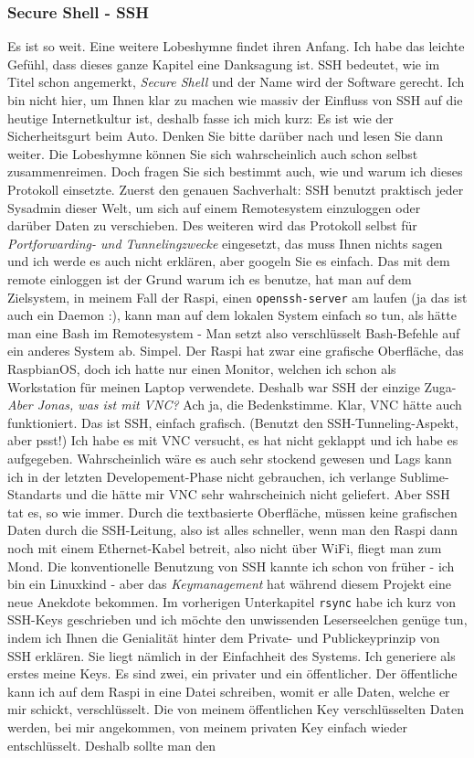 \documentclass[12pt,titlepage,a4paper]{article}
\begin{document}
\subsubsection{Secure Shell - SSH}
Es ist so weit. Eine weitere Lobeshymne findet ihren Anfang. Ich habe das leichte Gefühl, dass dieses ganze Kapitel eine Danksagung ist. SSH bedeutet, wie im Titel schon angemerkt, \textit{Secure Shell} und der Name wird der Software gerecht. Ich bin nicht hier, um Ihnen klar zu machen wie massiv der Einfluss von SSH auf die heutige Internetkultur ist, deshalb fasse ich mich kurz: Es ist wie der Sicherheitsgurt beim Auto. Denken Sie bitte darüber nach und lesen Sie dann weiter. Die Lobeshymne können Sie sich wahrscheinlich auch schon selbst zusammenreimen. Doch fragen Sie sich bestimmt auch, wie und warum ich dieses Protokoll einsetzte. Zuerst den genauen Sachverhalt: SSH benutzt praktisch jeder Sysadmin dieser Welt, um sich auf einem Remotesystem einzuloggen oder darüber Daten zu verschieben. Des weiteren wird das Protokoll selbst für \textit{Portforwarding- und Tunnelingzwecke} eingesetzt, das muss Ihnen nichts sagen und ich werde es auch nicht erklären, aber googeln Sie es einfach. Das mit dem remote einloggen ist der Grund warum ich es benutze, hat man auf dem Zielsystem, in meinem Fall der Raspi, einen \verb^openssh-server^ am laufen (ja das ist auch ein Daemon :), kann man auf dem lokalen System einfach so tun, als hätte man eine Bash im Remotesystem - Man setzt also verschlüsselt Bash-Befehle auf ein anderes System ab. Simpel. Der Raspi hat zwar eine grafische Oberfläche, das RaspbianOS, doch ich hatte nur einen Monitor, welchen ich schon als Workstation für meinen Laptop verwendete. Deshalb war SSH der einzige Zuga- \textit{Aber Jonas, was ist mit VNC?} Ach ja, die Bedenkstimme. Klar, VNC hätte auch funktioniert. Das ist SSH, einfach grafisch. (Benutzt den SSH-Tunneling-Aspekt, aber psst!) Ich habe es mit VNC versucht, es hat nicht geklappt und ich habe es aufgegeben. Wahrscheinlich wäre es auch sehr stockend gewesen und Lags kann ich in der letzten Developement-Phase nicht gebrauchen, ich verlange Sublime-Standarts und die hätte mir VNC sehr wahrscheinich nicht geliefert. Aber SSH tat es, so wie immer. Durch die textbasierte Oberfläche, müssen keine grafischen Daten durch die SSH-Leitung, also ist alles schneller, wenn man den Raspi dann noch mit einem Ethernet-Kabel betreit, also nicht über WiFi, fliegt man zum Mond. Die konventionelle Benutzung von SSH kannte ich schon von früher - ich bin ein Linuxkind - aber das \textit{Keymanagement} hat während diesem Projekt eine neue Anekdote bekommen. Im vorherigen Unterkapitel \verb/rsync/ habe ich kurz von SSH-Keys geschrieben und ich möchte den unwissenden Leserseelchen genüge tun, indem ich Ihnen die Genialität hinter dem Private- und Publickeyprinzip von SSH  erklären. Sie liegt nämlich in der Einfachheit des Systems. Ich generiere als erstes meine Keys. Es sind zwei, ein privater und ein öffentlicher. Der öffentliche kann ich auf dem Raspi in eine Datei schreiben, womit er alle Daten, welche er mir schickt, verschlüsselt. Die von meinem öffentlichen Key verschlüsselten Daten werden, bei mir angekommen, von meinem privaten Key einfach wieder entschlüsselt. Deshalb sollte man den 
\end{document}
